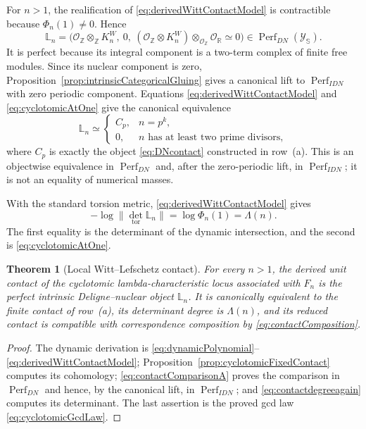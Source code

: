 \documentclass[11pt]{amsart}
\newtheorem{theorem}{Theorem}[section]
\theoremstyle{definition}
\theoremstyle{remark}
\newcommand{\R}{\mathbb R}
\newcommand{\Z}{\mathbb Z}
\begin{document}
For $n>1$, the realification of \eqref{eq:derivedWittContactModel} is
contractible because $\Phi_n(1)\ne0$.  Hence
\begin{equation}\label{eq:DNLefschetzComplex}
 \mathbb L_n=
 \bigl(\mathcal O_{\Z}\otimes_\Z K_n^W,\ 0,\
 (\mathcal O_{\Z}\otimes K_n^W)\otimes_{\mathcal O_{\Z}}
 \mathcal O_{\R}\simeq0\bigr)
 \in\operatorname{Perf}_{DN}(\mathscr Y_{\mathbb S}).
\end{equation}
It is perfect because its integral component is a two-term complex of
finite free modules.  Since its nuclear component is zero,
Proposition~\ref{prop:intrinsicCategoricalGluing} gives a canonical lift to
$\operatorname{Perf}_{IDN}$ with zero periodic component.  Equations
\eqref{eq:derivedWittContactModel} and \eqref{eq:cyclotomicAtOne} give the
canonical equivalence
\begin{equation}\label{eq:contactComparisonA}
 \mathbb L_n\simeq
 \begin{cases}
  C_p,&n=p^k,\\
  0,&n\text{ has at least two prime divisors},
 \end{cases}
\end{equation}
where $C_p$ is exactly the object \eqref{eq:DNcontact} constructed in
row~(a).  This is an objectwise equivalence in
$\operatorname{Perf}_{DN}$ and, after the zero-periodic lift, in
$\operatorname{Perf}_{IDN}$; it is not an equality of numerical masses.

With the standard torsion metric, \eqref{eq:derivedWittContactModel} gives
\begin{equation}\label{eq:contactdegreeagain}
 -\log\|\det_{\mathrm{tor}}\mathbb L_n\|
 =\log\Phi_n(1)=\Lambda(n).
\end{equation}
The first equality is the determinant of the dynamic intersection, and the
second is \eqref{eq:cyclotomicAtOne}.

\begin{theorem}[Local Witt--Lefschetz contact]\label{thm:rowbcontact}
For every $n>1$, the derived unit contact of the cyclotomic
lambda-characteristic locus associated with $F_n$ is
the perfect intrinsic Deligne--nuclear object $\mathbb L_n$.  It is canonically
equivalent to the finite contact of row~(a), its determinant degree is
$\Lambda(n)$, and its reduced contact is compatible with correspondence
composition by \eqref{eq:contactComposition}.
\end{theorem}

\begin{proof}
The dynamic derivation is
\eqref{eq:dynamicPolynomial}--\eqref{eq:derivedWittContactModel};
Proposition~\ref{prop:cyclotomicFixedContact} computes its cohomology;
\eqref{eq:contactComparisonA} proves the comparison in
$\operatorname{Perf}_{DN}$ and hence, by the canonical lift, in
$\operatorname{Perf}_{IDN}$; and \eqref{eq:contactdegreeagain} computes its
determinant.  The last assertion is the proved gcd law
\eqref{eq:cyclotomicGcdLaw}.
\end{proof}
\end{document}
